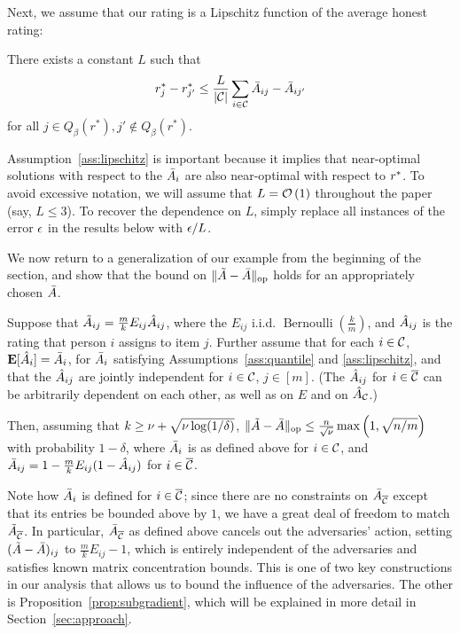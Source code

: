 Next, we assume that our rating is a Lipschitz function of the average 
honest rating:
\begin{assumption}
\label{ass:lipschitz}
There exists a constant $L$ such that 
\[ r^*_j - r^*_{j'} \leq \frac{L}{|\mathcal{C}|}\sum_{i \in \mathcal{C}} \bar{A}_{ij} - \bar{A}_{ij'} \]
for all $j \in Q_{\beta}(r^*), j' \not\in Q_{\beta}(r^*)$.
\end{assumption}
Assumption~\ref{ass:lipschitz} is important because it implies that 
near-optimal solutions with respect to the $\bar{A}_i$ are also near-optimal 
with respect to $r^*$.
To avoid excessive notation, we will assume that $L = \mathcal{O}\left( 1 \right)$ throughout 
the paper (say, $L \leq 3$). To recover the dependence on $L$, simply replace 
all instances of the error $\epsilon$ in the results below with $\epsilon/L$.

We now return to a generalization of our example from the beginning of the 
section, and show that the bound on $\|\tilde{A} - \bar{A}\|_{\mathrm{op}}$ holds for an 
appropriately chosen $\bar{A}$.
\begin{proposition}
\label{prop:sampling-reduction}
Suppose that $\tilde{A}_{ij} = \frac{m}{k}E_{ij}\hat{A}_{ij}$, 
where the $E_{ij}$ i.i.d. $\operatorname{Bernoulli}(\frac{k}{m})$, and 
$\hat{A}_{ij}$ is the rating that person $i$ assigns to item $j$. Further 
assume that for each $i \in \mathcal{C}$, $\mathbf{E}[\hat{A}_{i}] = \bar{A}_i$, 
for $\bar{A}_i$ satisfying Assumptions~\ref{ass:quantile} and \ref{ass:lipschitz},
 and that the $\hat{A}_{ij}$ are jointly independent for 
$i \in \mathcal{C}$, $j \in [m]$. (The $\hat{A}_{ij}$ for $i \in \overline{\mathcal{C}}$ can be 
arbitrarily dependent on each other, as well as on $E$ and on 
$\hat{A}_{\mathcal{C}}$.)

Then, assuming that $k \geq \nu + \sqrt{\nu \log(1/\delta)}$, 
$\|\tilde{A} - \bar{A}\|_{\mathrm{op}} \leq \frac{n}{\sqrt{\nu}}\max\left( 1, \sqrt{n/m} \right)$
with probability $1-\delta$, where $\bar{A}_i$ is 
as defined above for $i \in \mathcal{C}$, and 
$\bar{A}_{ij} = 1 - \frac{m}{k}E_{ij}(1 - \hat{A}_{ij})$ for $i \in \overline{\mathcal{C}}$.
\end{proposition}
Note how $\bar{A}_i$ is defined for $i \in \overline{\mathcal{C}}$; since there are no constraints 
on $\bar{A}_{\overline{\mathcal{C}}}$ except that its entries be bounded above by $1$, we have a 
great deal of freedom to match $\tilde{A}_{\overline{\mathcal{C}}}$. In particular, $\bar{A}_{\overline{\mathcal{C}}}$ 
as defined above cancels out the adversaries' action, setting 
$(\tilde{A} - \bar{A})_{ij}$ to $\frac{m}{k}E_{ij} - 1$, which is entirely independent 
of the adversaries and satisfies known matrix concentration bounds.
This is one of two key constructions in our analysis that allows us to bound 
the influence of the adversaries. The other is Proposition~\ref{prop:subgradient}, 
which will be explained in more detail in Section~\ref{sec:approach}.

